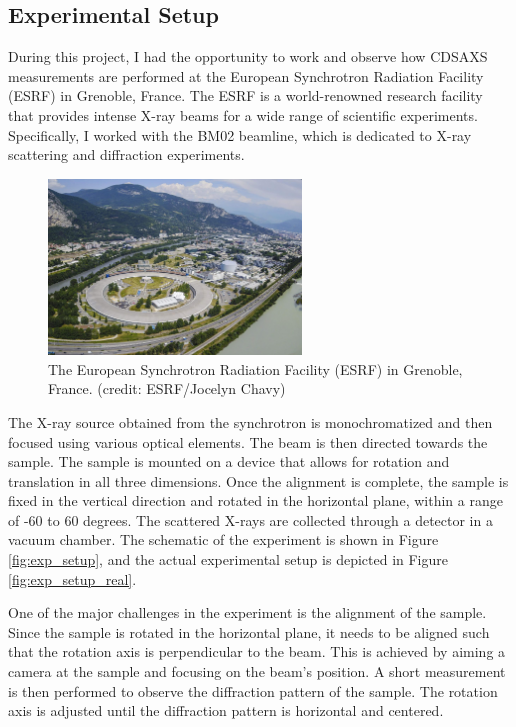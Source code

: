 \medskip




\subsection{Experimental Setup}

During this project, I had the opportunity to work and observe how CDSAXS 
measurements are performed at the European Synchrotron Radiation Facility (ESRF)
in Grenoble, France. The ESRF is a world-renowned research facility that provides
intense X-ray beams for a wide range of scientific experiments. Specifically,
I worked with the BM02 beamline, which is dedicated to X-ray scattering and
   diffraction experiments.

\begin{figure}[h]
\centering
\includegraphics[width=0.6\textwidth]{images/esrf.jpg}
\caption{The European Synchrotron Radiation Facility (ESRF) in Grenoble, France. (credit: ESRF/Jocelyn Chavy)}
\label{fig
}
\end{figure}

The X-ray source obtained from the synchrotron is monochromatized and then focused using
various optical elements. The beam is then directed towards the sample. The 
sample is mounted on a device that allows for rotation and translation in all 
three dimensions. Once the alignment is complete, the sample is fixed in the
vertical direction and rotated in the horizontal plane, within a range of -60
to 60 degrees. The scattered X-rays are collected through a detector in a 
vacuum chamber. The schematic of the experiment is shown in Figure \ref{fig:exp_setup},
and the actual experimental setup is depicted in Figure \ref{fig:exp_setup_real}.

\medskip

One of the major challenges in the experiment is the alignment of the sample. 
Since the sample is rotated in the horizontal plane, it needs to be aligned 
such that the rotation axis is perpendicular to the beam. This is achieved by 
aiming a camera at the sample and focusing on the beam's position. A short 
measurement is then performed to observe the diffraction pattern of the sample.
 The rotation axis is adjusted until the diffraction pattern is horizontal and 
 centered.

